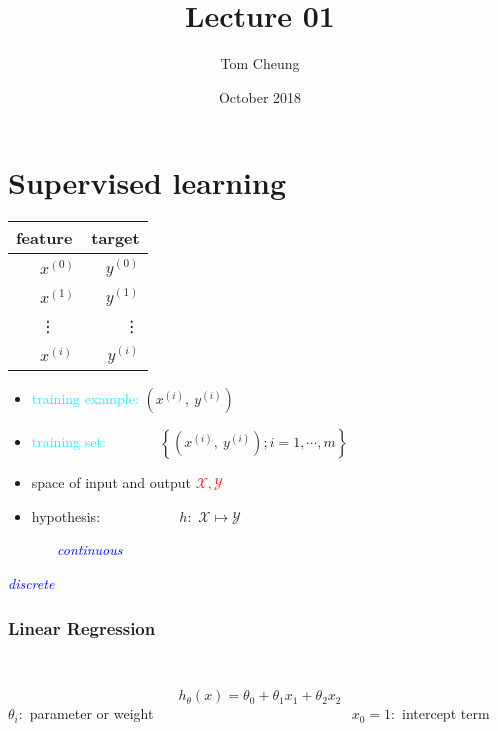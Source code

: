 \documentclass[a4paper, 12pt]{article}
\title{Lecture 01}
\author{Tom Cheung}
\date{October 2018}
\begin{document}
\maketitle

\part*{Supervised learning}
\begin{center}
    \begin{tabular}{ l | r }		
        \textbf{feature} & \textbf{target} \\\hline
        ~~~$x^{(0)}$ & $y^{(0)}$ \\ 
        ~~~$x^{(1)}$ & $y^{(1)}$ \\
        ~~~\vdots    & \vdots \\ 
        ~~~$x^{(i)}$ & $y^{(i)}$
    \end{tabular}
\end{center}
\begin{itemize}
    \item \textcolor{cyan}{training example: }    $(x^{(i)},~y^{(i)})$
    \item \textcolor{cyan}{training set: } ~~~~~~~$\left\{(x^{(i)},~y^{(i)});i = 1, \cdots, m\right\}$
    \item space of input and output               \textcolor{red}{$\mathcal{X}, \mathcal{Y}$}
    \item hypothesis: ~~~~~~~~~~                  $h: $ $\mathcal{X} \mapsto \mathcal{Y}$
\end{itemize}\par\par
\begin{description}[align=left]
\item [\textbf{REGRESSION}] ~~~~~~~\textit{\textcolor{blue}{continuous}}
\item [\textbf{CLASSIFICATION}]    \textit{\textcolor{blue}{discrete}}
\end{description}
\section{Linear Regression}
  \\


\begin{tcolorbox}[colback=red!5!white,colframe=red!75!black]
    \begin{equation}
        h_\theta(x) = \theta_{0} + \theta_{1}x_{1} + \theta_{2}x_{2}
    \end{equation}
   \tcblower
  $\theta_{i}: $ parameter or weight ~~~~~~~~~~~~~~~~~~~~~~~~~~~ $x_{0} = 1: $ intercept term
\end{tcolorbox}
\end{document}
